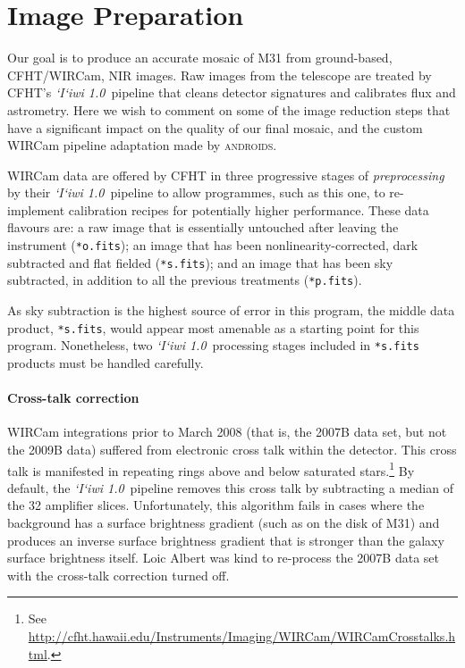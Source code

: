 \documentclass[iop]{emulateapj}
\newcommand{\sw}[1]{\textit{#1}} %
\newcommand{\iiwione}{\sw{`I`iwi 1.0}}
\newcommand{\androids}{\textsc{androids}}
\begin{document}

\section{Image Preparation}
\label{sec:reduction}

Our goal is to produce an accurate mosaic of M31 from ground-based, CFHT/WIRCam, NIR images. Raw images from the telescope are treated by CFHT's \iiwione\ pipeline that cleans detector signatures and calibrates flux and astrometry. Here we wish to comment on some of the image reduction steps that have a significant impact on the quality of our final mosaic, and the custom WIRCam pipeline adaptation made by \androids.

WIRCam data are offered by CFHT in three progressive stages of \emph{preprocessing} by their \iiwione\ pipeline to allow programmes, such as this one, to re-implement calibration recipes for potentially higher performance. These data flavours are: a raw image that is essentially untouched after leaving the instrument (\texttt{*o.fits}); an image that has been nonlinearity-corrected, dark subtracted and flat fielded (\texttt{*s.fits}); and an image that has been sky subtracted, in addition to all the previous treatments (\texttt{*p.fits}).

As sky subtraction is the highest source of error in this program, the middle data product, \texttt{*s.fits}, would appear most amenable as a starting point for this program. Nonetheless, two \iiwione\ processing stages included in \texttt{*s.fits} products must be handled carefully.

\paragraph{Cross-talk correction} WIRCam integrations prior to March 2008 (that is, the 2007B data set, but not the 2009B data) suffered from electronic cross talk within the detector. This cross talk is manifested in repeating rings above and below saturated stars.\footnote{See \url{http://cfht.hawaii.edu/Instruments/Imaging/WIRCam/WIRCamCrosstalks.html}.} By default, the \iiwione\ pipeline removes this cross talk by subtracting a median of the 32 amplifier slices. Unfortunately, this algorithm fails in cases where the background has a surface brightness gradient (such as on the disk of M31) and produces an inverse surface brightness gradient that is stronger than the galaxy surface brightness itself. Loic Albert was kind to re-process the 2007B data set with the cross-talk correction turned off.
\end{document}
